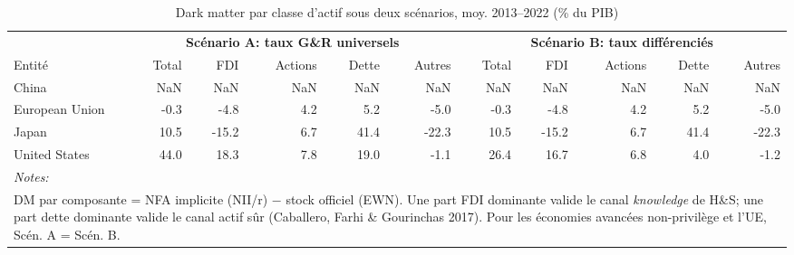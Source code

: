 \documentclass[11pt]{article}
\begin{document}
\small\setcounter{table}{7}
\begin{table}[!h]
\centering
\caption{\label{tab:tab:dm_decomp}Dark matter par classe d'actif sous deux scénarios, moy. 2013--2022 (\% du PIB)}
\centering
\fontsize{9.5}{11.5}\selectfont
\begin{tabular}[t]{lrrrrrrrrrr}
\toprule
\multicolumn{1}{c}{\textbf{ }} & \multicolumn{5}{c}{\textbf{Scénario A: taux G\&R universels}} & \multicolumn{5}{c}{\textbf{Scénario B: taux différenciés}} \\
\cmidrule(l{3pt}r{3pt}){2-6} \cmidrule(l{3pt}r{3pt}){7-11}
Entité & Total & FDI & Actions & Dette & Autres & Total & FDI & Actions & Dette & Autres\\
\midrule
China & NaN & NaN & NaN & NaN & NaN & NaN & NaN & NaN & NaN & NaN\\
European Union & -0.3 & -4.8 & 4.2 & 5.2 & -5.0 & -0.3 & -4.8 & 4.2 & 5.2 & -5.0\\
Japan & 10.5 & -15.2 & 6.7 & 41.4 & -22.3 & 10.5 & -15.2 & 6.7 & 41.4 & -22.3\\
United States & 44.0 & 18.3 & 7.8 & 19.0 & -1.1 & 26.4 & 16.7 & 6.8 & 4.0 & -1.2\\
\bottomrule
\multicolumn{11}{l}{\rule{0pt}{1em}\textit{\textit{Notes:} }}\\
\multicolumn{11}{l}{\rule{0pt}{1em}DM par composante = NFA implicite (NII/r) $-$ stock officiel (EWN). Une part FDI dominante valide le canal \textit{knowledge} de H\&S; une part dette dominante valide le canal actif s\^{u}r (Caballero, Farhi \& Gourinchas 2017). Pour les \'{e}conomies avancées non-privilège et l'UE, Scén. A = Scén. B.}\\
\end{tabular}
\end{table}
\end{document}
